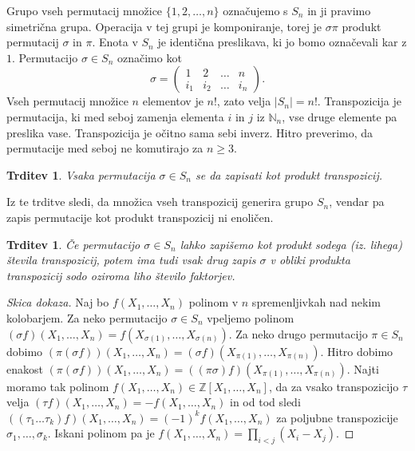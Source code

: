 \documentclass[10pt, a4paper]{article}
\newtheorem{trditev}[izr]{Trditev}
\newenvironment{noticeC}{%
  \tcolorbox[%
  notitle,
  empty,
  enhanced,  %
  breakable,
  coltext=black, 
  fontupper=\rmfamily,
  noparskip,
  sharp corners,
  boxrule=-1pt,  %
  frame hidden,
  left=7pt,  %
  right=7pt,
  top=5pt,
  bottom=5pt,
  before skip=2.5ex plus 2pt,
  after skip=2.5ex plus 2pt,
  overlay unbroken and last={%
  },
  ]}
{\endtcolorbox}
\newenvironment{dokaz}%
  {\begin{noticeC}\begin{proof}}%
  {\end{proof}\end{noticeC}}
\newcommand{\N}{\mathbb {N}}
\newcommand{\Z}{\mathbb {Z}}
\begin{document}
Grupo vseh permutacij množice $\{1, 2, \dots, n\}$ označujemo s $S_n$ in ji pravimo simetrična grupa.
Operacija v tej grupi je komponiranje, torej je $\sigma \pi$ produkt permutacij $\sigma$ in $\pi$.
Enota v $S_n$ je identična preslikava, ki jo bomo označevali kar z $1$.
Permutacijo $\sigma \in S_n$ označimo kot 
$$\sigma = \begin{pmatrix}
  1 & 2 & \dots & n\\
  i_1 & i_2 & \dots & i_n
\end{pmatrix}.$$
Vseh permutacij množice $n$ elementov je $n!$, zato velja $|S_n| = n!$.
Transpozicija je permutacija, ki med seboj zamenja elementa $i$ in $j$ iz $\N_n$,
vse druge elemente pa preslika vase. Transpozicija je očitno sama sebi inverz.
Hitro preverimo, da permutacije med seboj ne komutirajo za $n \geq 3$.

\begin{trditev}
  Vsaka permutacija $\sigma \in S_n$ se da zapisati kot produkt transpozicij.
\end{trditev}

Iz te trditve sledi, da množica vseh transpozicij generira grupo $S_n$,
vendar pa zapis permutacije kot produkt transpozicij ni enoličen.

\begin{trditev}
  Če permutacijo $\sigma \in S_n$ lahko zapišemo kot produkt sodega (iz. lihega)
  števila transpozicij, potem ima tudi vsak drug zapis $\sigma$ v obliki produkta transpozicij 
  sodo oziroma liho število faktorjev.
\end{trditev}

\begin{dokaz}[Skica dokaza]
  Naj bo $f(X_1, \dots, X_n)$ polinom v $n$ spremenljivkah nad nekim kolobarjem. Za neko permutacijo $\sigma \in S_n$
  vpeljemo polinom $(\sigma f) (X_1, \dots, X_n) = f(X_{\sigma(1)}, \dots, X_{\sigma(n)})$.
  Za neko drugo permutacijo $\pi \in S_n$ dobimo $(\pi(\sigma f)) (X_1, \dots, X_n) = (\sigma f)(X_{\pi(1)}, \dots, X_{\pi(n)})$.
  Hitro dobimo enakost $(\pi(\sigma f)) (X_1, \dots, X_n) = ((\pi \sigma) f)(X_{\pi(1)}, \dots, X_{\pi(n)})$.
  Najti moramo tak polinom $f(X_1, \dots, X_n) \in \Z[X_1, \dots, X_n]$, da za vsako transpozicijo $\tau$
  velja $(\tau f)(X_1, \dots, X_n) = -f(X_1, \dots, X_n)$ in od tod sledi 
  $((\tau_1 \dots \tau_k) f)(X_1, \dots, X_n) = (-1)^k f(X_1, \dots, X_n)$ za poljubne transpozicije $\sigma_1, \dots, \sigma_k$.
  Iskani polinom pa je $f(X_1, \dots, X_n) = \prod_{i < j} (X_i - X_j)$.
\end{dokaz}
\end{document}
